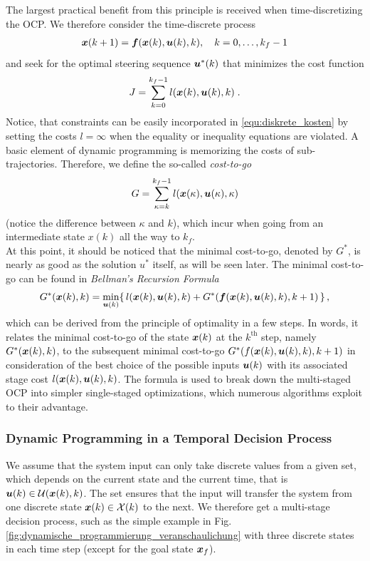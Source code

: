 The largest practical benefit from this principle is received when time-discretizing the OCP. We therefore consider the time-discrete process
\begin{align} \label{equ:diskreter_prozess}
	\bs x(k+1) = \bs f(\bs x(k), \bs u(k), k), \quad k=0,\ldots, k_f-1
\end{align}
and seek for the optimal steering sequence $\boldsymbol{u}^\ast (k)$ that minimizes the cost function
\begin{align}
	J = \sum_{k=0}^{k_f-1} l(\bs x(k), \bs u(k),k) \;. \label{equ:diskrete_kosten} %
\end{align}
Notice, that constraints can be easily incorporated in \eqref{equ:diskrete_kosten} by setting the costs $l=\infty$ when the equality or inequality equations are violated.
A basic element of dynamic programming is memorizing the costs of sub-trajectories. Therefore, we define the so-called \emph{cost-to-go}
\begin{align*}
	G = \sum_{\kappa = k}^{k_f-1} l(\bs x(\kappa), \bs u(\kappa),\kappa) %
\end{align*}
(notice the difference between $\kappa$ and $k$), which incur when going from an intermediate state $x(k)$ all the way to $k_f$.\\
At this point, it should be noticed that the minimal cost-to-go, denoted by $G^\ast$, is nearly as good as the solution $u^\ast$ itself, as will be seen later. The minimal cost-to-go can be found in \emph{Bellman’s Recursion Formula}
\begin{align*}
 G^\ast(\boldsymbol{x}(k),k) = \min_{\boldsymbol{u}(k)}\{\,l(\boldsymbol{x}(k), \boldsymbol{u}(k), k) + G^\ast(\boldsymbol{f}(\boldsymbol{x}(k), \boldsymbol{u}(k), k), k+1)\,\} \, ,
\end{align*}
which can be derived from the principle of optimality in a few steps. 
In words, it relates the minimal cost-to-go of the state $\boldsymbol{x}(k)$ at the $k^\mathrm{th}$  step, namely $G^\ast (\boldsymbol{x}(k),k)$, to the subsequent minimal cost-to-go $G^\ast (f(\boldsymbol{x}(k),\boldsymbol{u}(k),k),k+1)$ in consideration of the best choice of the possible inputs $\boldsymbol{u}(k)$ with its associated stage cost $l(\boldsymbol{x}(k),\boldsymbol{u}(k),k)$. The formula is used to break down the multi-staged OCP into simpler single-staged optimizations, which numerous algorithms exploit to their advantage.

\subsubsection{Dynamic Programming in a Temporal Decision Process}\label{57.3.3.2}
We assume that the system input can only take discrete values from a given set, which depends on the current state and the current time, that is $\boldsymbol{u}(k) \in \mathcal U(\boldsymbol{x}(k),k)$. 
The set ensures that the input will transfer the system from one discrete state $\boldsymbol{x}(k) \in \mathcal X(k)$ to the next. We therefore get a multi-stage decision process, such as the simple example in  Fig.\,\ref{fig:dynamische_programmierung_veranschaulichung} with three discrete states in each time step (except for the goal state $\boldsymbol{x}_f$). 

